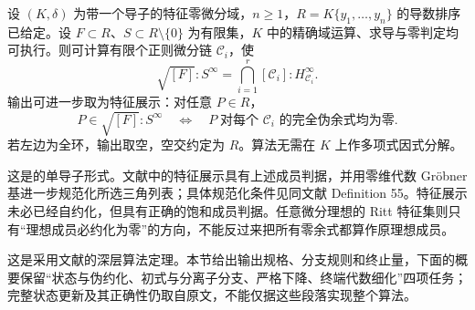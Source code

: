\begin{theorem}\label{b3:thm:rosenfeld-groebner}
	设 \((K,\delta)\) 为带一个导子的特征零微分域，\(n\ge1\)，\(R=K\{y_1,\ldots,y_n\}\) 的导数排序已给定。设 \(F\subset R\)、\(S\subset R\setminus\{0\}\) 为有限集，\(K\) 中的精确域运算、求导与零判定均可执行。则可计算有限个正则微分链 \(\mathcal C_i\)，使
	\[
		\sqrt{[F]}:S^\infty =\bigcap_{i=1}^r[\mathcal C_i]:H_{\mathcal C_i}^{\infty}.
	\]
	输出可进一步取为特征展示：对任意 \(P\in R\)，
	\[
		P\in\sqrt{[F]}:S^\infty \quad\Longleftrightarrow\quad P\;\text{对每个 \(\mathcal C_i\) 的完全伪余式均为零}.
	\]
	若左边为全环，输出取空，空交约定为 \(R\)。算法无需在 \(K\) 上作多项式因式分解。
\end{theorem}

这是\cite[Section 6.2, Theorem 60]{BoulierLazardOllivierPetitot2009DifferentialIdeals}的单导子形式。文献中的特征展示具有上述成员判据，并用零维代数 Gröbner 基进一步规范化所选三角列表；具体规范化条件见同文献 Definition 55。特征展示未必已经自约化，但具有正确的饱和成员判据。任意微分理想的 Ritt 特征集则只有“理想成员必约化为零”的方向，不能反过来把所有零余式都算作原理想成员。

这是采用文献的深层算法定理。本节给出输出规格、分支规则和终止量，下面的概要保留“状态与伪约化、初式与分离子分支、严格下降、终端代数细化”四项任务；完整状态更新及其正确性仍取自原文，不能仅据这些段落实现整个算法。


